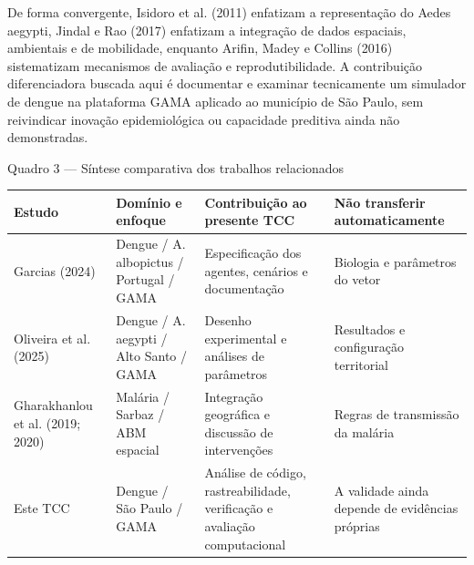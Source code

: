 De forma convergente, Isidoro et al. (2011) enfatizam a representação do
Aedes aegypti, Jindal e Rao (2017) enfatizam a integração de dados
espaciais, ambientais e de mobilidade, enquanto Arifin, Madey e Collins
(2016) sistematizam mecanismos de avaliação e reprodutibilidade. A
contribuição diferenciadora buscada aqui é documentar e examinar
tecnicamente um simulador de dengue na plataforma GAMA aplicado ao
município de São Paulo, sem reivindicar inovação epidemiológica ou
capacidade preditiva ainda não demonstradas.

Quadro 3 --- Síntese comparativa dos trabalhos relacionados

\begin{longtable}[]{@{}
  >{\raggedright\arraybackslash}p{}
  >{\raggedright\arraybackslash}p{}
  >{\raggedright\arraybackslash}p{}
  >{\raggedright\arraybackslash}p{}@{}}
\toprule\noalign{}
\begin{minipage}[b]{\linewidth}\raggedright
\textbf{Estudo}
\end{minipage} & \begin{minipage}[b]{\linewidth}\raggedright
\textbf{Domínio e enfoque}
\end{minipage} & \begin{minipage}[b]{\linewidth}\raggedright
\textbf{Contribuição ao presente TCC}
\end{minipage} & \begin{minipage}[b]{\linewidth}\raggedright
\textbf{Não transferir automaticamente}
\end{minipage} \\
\midrule\noalign{}
\endhead
\bottomrule\noalign{}
\endlastfoot
Garcias (2024) & Dengue / A. albopictus / Portugal / GAMA &
Especificação dos agentes, cenários e documentação & Biologia e
parâmetros do vetor \\
Oliveira et al. (2025) & Dengue / A. aegypti / Alto Santo / GAMA &
Desenho experimental e análises de parâmetros & Resultados e
configuração territorial \\
Gharakhanlou et al. (2019; 2020) & Malária / Sarbaz / ABM espacial &
Integração geográfica e discussão de intervenções & Regras de
transmissão da malária \\
Este TCC & Dengue / São Paulo / GAMA & Análise de código,
rastreabilidade, verificação e avaliação computacional & A validade
ainda depende de evidências próprias \\
\end{longtable}

